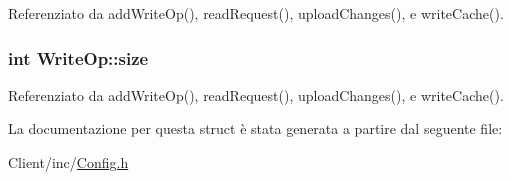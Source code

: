 Referenziato da add\+Write\+Op(), read\+Request(), upload\+Changes(), e write\+Cache().

\hypertarget{structWriteOp_af804d8a1e3d428ee7275b5e4f467d23a}{
\subsubsection[{size}]{\setlength{\rightskip}{0pt plus 5cm}int Write\+Op\+::size}}\label{structWriteOp_af804d8a1e3d428ee7275b5e4f467d23a}


Referenziato da add\+Write\+Op(), read\+Request(), upload\+Changes(), e write\+Cache().



La documentazione per questa struct è stata generata a partire dal seguente file\+:\begin{DoxyCompactItemize}
\item 
Client/inc/\hyperlink{Client_2inc_2Config_8h}{Config.\+h}\end{DoxyCompactItemize}
